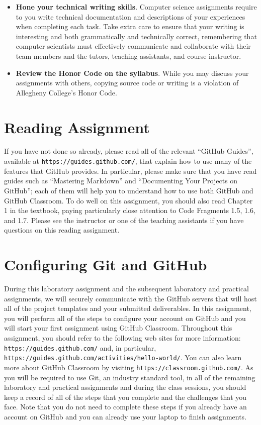 \documentclass[11pt]{article}
\newcommand{\url}[1]{\lstinline{#1}}
\begin{document}
\begin{itemize}
\item {\bf Hone your technical writing skills}. Computer science assignments
  require to you write technical documentation and descriptions of your
  experiences when completing each task. Take extra care to ensure that your
  writing is interesting and both grammatically and technically correct,
  remembering that computer scientists must effectively communicate and
  collaborate with their team members and the tutors, teaching assistants, and
  course instructor.

\item {\bf Review the Honor Code on the syllabus}. While you may discuss your
  assignments with others, copying source code or writing is a violation of
  Allegheny College's Honor Code.

\end{itemize}

\section*{Reading Assignment}

If you have not done so already, please read all of the relevant ``GitHub
Guides'', available at \url{https://guides.github.com/}, that explain how to use
many of the features that GitHub provides. In particular, please make sure that
you have read guides such as ``Mastering Markdown'' and ``Documenting Your
Projects on GitHub''; each of them will help you to understand how to use both
GitHub and GitHub Classroom. To do well on this assignment, you should also read
Chapter 1 in the textbook, paying particularly close attention to Code Fragments
1.5, 1.6, and 1.7. Please see the instructor or one of the teaching assistants
if you have questions on this reading assignment.

\section*{Configuring Git and GitHub}

During this laboratory assignment and the subsequent laboratory and practical
assignments, we will securely communicate with the GitHub servers that will host
all of the project templates and your submitted deliverables. In this
assignment, you will perform all of the steps to configure your account on
GitHub and you will start your first assignment using GitHub Classroom.
Throughout this assignment, you should refer to the following web sites for more
information: \url{https://guides.github.com/} and, in particular,
\url{https://guides.github.com/activities/hello-world/}. You can also learn more
about GitHub Classroom by visiting \url{https://classroom.github.com/}. As you
will be required to use Git, an industry standard tool, in all of the remaining
laboratory and practical assignments and during the class sessions, you should
keep a record of all of the steps that you complete and the challenges that you
face. Note that you do not need to complete these steps if you already have an
account on GitHub and you can already use your laptop to finish assignments.
\end{document}
